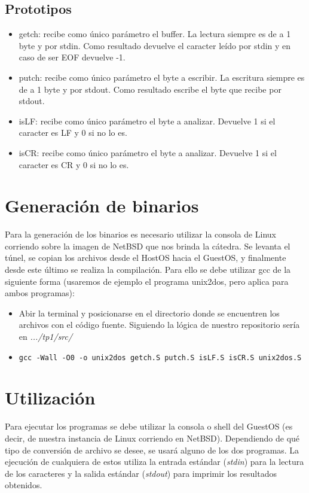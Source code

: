 \documentclass[a4paper,11pt]{article}
\begin{document}
\subsection{Prototipos}
\begin{itemize}
\item getch: recibe como \'unico par\'ametro el buffer. La lectura siempre es de a 1 byte y por stdin. Como resultado devuelve el caracter le\'ido por stdin y en caso de ser EOF devuelve -1.

\item putch: recibe como \'unico par\'ametro el byte a escribir. La escritura siempre es de a 1 byte y por stdout. Como resultado escribe el byte que recibe por stdout.

\item isLF: recibe como \'unico par\'ametro el byte a analizar. Devuelve 1 si el caracter es LF y 0 si no lo es.

\item isCR: recibe como \'unico par\'ametro el byte a analizar. Devuelve 1 si el caracter es CR y 0 si no lo es.
\end{itemize}

\section{Generaci\'on de binarios}
Para la generaci\'on de los binarios es necesario utilizar la consola de Linux corriendo sobre la imagen de NetBSD que nos brinda la cátedra. Se levanta el túnel, se copian los archivos desde el HostOS hacia el GuestOS, y finalmente desde este último se realiza la compilación. Para ello se debe utilizar gcc de la siguiente forma (usaremos de ejemplo el programa unix2dos, pero aplica para ambos programas):

\begin{itemize}
\item Abir la terminal y posicionarse en el directorio donde se encuentren los archivos con el c\'odigo fuente. Siguiendo la lógica de nuestro repositorio sería en \textit{.../tp1/src/}
\item \begin{verbatim}
gcc -Wall -O0 -o unix2dos getch.S putch.S isLF.S isCR.S unix2dos.S
\end{verbatim} 
\end{itemize}

\section{Utilización}
Para ejecutar los programas se debe utilizar la consola o shell del GuestOS (es decir, de nuestra instancia de Linux corriendo en NetBSD). Dependiendo de qué tipo de conversión de archivo se desee, se usará alguno de los dos programas. La ejecución de cualquiera de estos utiliza la entrada estándar (\textit{stdin}) para la lectura de los caracteres y la salida estándar (\textit{stdout}) para imprimir los resultados obtenidos.
\end{document}
